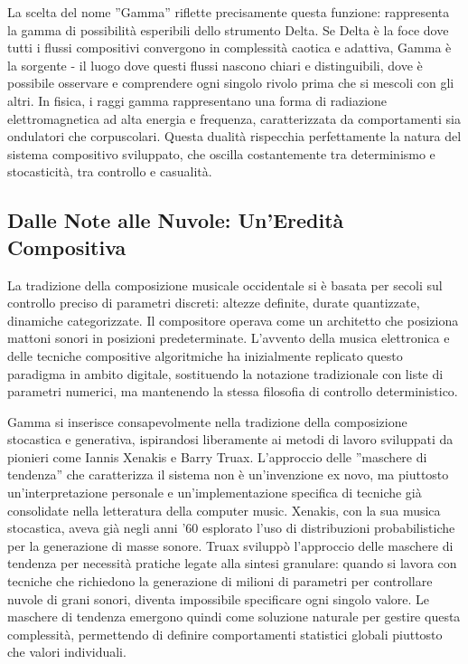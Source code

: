 La scelta del nome ''Gamma'' riflette precisamente questa funzione: rappresenta la gamma di possibilità esperibili dello strumento Delta. Se Delta è la foce dove tutti i flussi compositivi convergono in complessità caotica e adattiva, Gamma è la sorgente - il luogo dove questi flussi nascono chiari e distinguibili, dove è possibile osservare e comprendere ogni singolo rivolo prima che si mescoli con gli altri. In fisica, i raggi gamma rappresentano una forma di radiazione elettromagnetica ad alta energia e frequenza, caratterizzata da comportamenti sia ondulatori che corpuscolari. Questa dualità rispecchia perfettamente la natura del sistema compositivo sviluppato, che oscilla costantemente tra determinismo e stocasticità, tra controllo e casualità.
\subsection{Dalle Note alle Nuvole: Un'Eredità Compositiva}
La tradizione della composizione musicale occidentale si è basata per secoli sul controllo preciso di parametri discreti: altezze definite, durate quantizzate, dinamiche categorizzate. Il compositore operava come un architetto che posiziona mattoni sonori in posizioni predeterminate. L'avvento della musica elettronica e delle tecniche compositive algoritmiche ha inizialmente replicato questo paradigma in ambito digitale, sostituendo la notazione tradizionale con liste di parametri numerici, ma mantenendo la stessa filosofia di controllo deterministico.

Gamma si inserisce consapevolmente nella tradizione della composizione stocastica e generativa, ispirandosi liberamente ai metodi di lavoro sviluppati da pionieri come Iannis Xenakis e Barry Truax. L'approccio delle ''maschere di tendenza'' che caratterizza il sistema non è un'invenzione ex novo, ma piuttosto un'interpretazione personale e un'implementazione specifica di tecniche già consolidate nella letteratura della computer music. Xenakis, con la sua musica stocastica, aveva già negli anni '60 esplorato l'uso di distribuzioni probabilistiche per la generazione di masse sonore. Truax sviluppò l'approccio delle maschere di tendenza per necessità pratiche legate alla sintesi granulare: quando si lavora con tecniche che richiedono la generazione di milioni di parametri per controllare nuvole di grani sonori, diventa impossibile specificare ogni singolo valore. Le maschere di tendenza emergono quindi come soluzione naturale per gestire questa complessità, permettendo di definire comportamenti statistici globali piuttosto che valori individuali.


